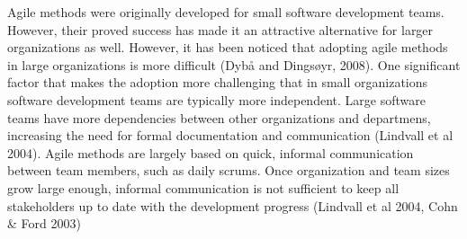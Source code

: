 Agile methods were originally developed for small software development teams.
However, their proved success has made it an attractive alternative for larger
organizations as well. However, it has been noticed that adopting agile methods
in large organizations is more difficult (Dybå and Dingsøyr, 2008). One
significant factor that makes the adoption more challenging that in small
organizations software development teams are typically more independent.
Large software teams have more dependencies between other organizations and
departmens, increasing the need for formal documentation and communication
(Lindvall et al 2004). Agile methods are largely based on quick, informal
communication between team members, such as daily scrums. Once organization and
team sizes grow large enough, informal communication is not sufficient to keep
all stakeholders up to date with the development progress (Lindvall et al 2004,
Cohn \& Ford 2003)

